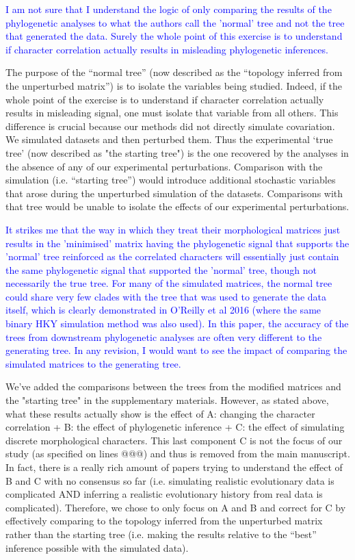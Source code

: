\documentclass[12pt,letterpaper]{article}
\begin{document}
\textcolor{blue}{I am not sure that I understand the logic of only comparing the results of the phylogenetic analyses to what the authors call the 'normal' tree and not the tree that generated the data. Surely the whole point of this exercise is to understand if character correlation actually results in misleading phylogenetic inferences.}

The purpose of the “normal tree” (now described as the ``topology inferred from the unperturbed matrix'') is to isolate the variables being studied. Indeed, if the whole point of the exercise is to understand if character correlation actually results in misleading signal, one must isolate that variable from all others. This difference is crucial because our methods did not directly simulate covariation. We simulated datasets and then perturbed them. Thus the experimental ‘true tree’ (now described as "the starting tree") is the one recovered by the analyses in the absence of any of our experimental perturbations. Comparison with the simulation (i.e. “starting tree”) would introduce additional stochastic variables that arose during the unperturbed simulation of the datasets. Comparisons with that tree would be unable to isolate the effects of our experimental perturbations.



\textcolor{blue}{It strikes me that the way in which they treat their morphological matrices just results in the 'minimised' matrix having the phylogenetic signal that supports the 'normal' tree reinforced as the correlated characters will essentially just contain the same phylogenetic signal that supported the 'normal' tree, though not necessarily the true tree.  For many of the simulated matrices, the normal tree could share very few clades with the tree that was used to generate the data itself, which is clearly demonstrated in O'Reilly et al 2016 (where the same binary HKY simulation method was also used). In this paper, the accuracy of the trees from downstream phylogenetic analyses are often very different to the generating tree. In any revision, I would want to see the impact of comparing the simulated matrices to the generating tree.}

We’ve added the comparisons between the trees from the modified matrices and the "starting tree" in the supplementary materials. %
However, as stated above, what these results actually show is the effect of A: changing the character correlation + B: the effect of phylogenetic inference + C: the effect of simulating discrete morphological characters. This last component C is not the focus of our study (as specified on lines @@@) and thus is removed from the main manuscript. In fact, there is a really rich amount of papers trying to understand the effect of B and C with no consensus so far (i.e. simulating realistic evolutionary data is complicated AND inferring a realistic evolutionary history from real data is complicated). Therefore, we chose to only focus on A and B and correct for C by effectively comparing to the topology inferred from the unperturbed matrix rather than the starting tree (i.e. making the results relative to the ``best'' inference possible with the simulated data). 
\end{document}
